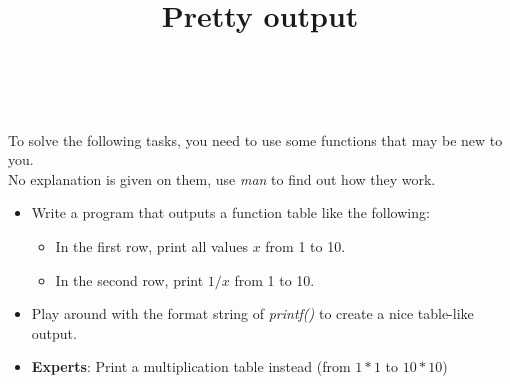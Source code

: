 


\title{Pretty output} %
\author{} %
\renewcommand{\difficulty}{Medium} %
\renewcommand{\requirements}{Man, standard library} %
\renewcommand{\aims}{Get used to man} %


 \maketitle
 \taskinfos

\ \\\ \\
To solve the following tasks, you need to use some functions that may be new to you. \\
No explanation is given on them, use \textit{man} to find out how they work. \\
\begin{itemize}
	\item Write a program that outputs a function table like the following:
	\begin{itemize}
		\item In the first row, print all values $x$ from 1 to 10.
		\item In the second row, print $1/x$ from 1 to 10.
	\end{itemize}
	\item Play around with the format string of \textit{printf()} to create a nice table-like output.
	\item \textbf{Experts}: Print a multiplication table instead (from $1*1$ to $10*10$)
\end{itemize}
 
 


